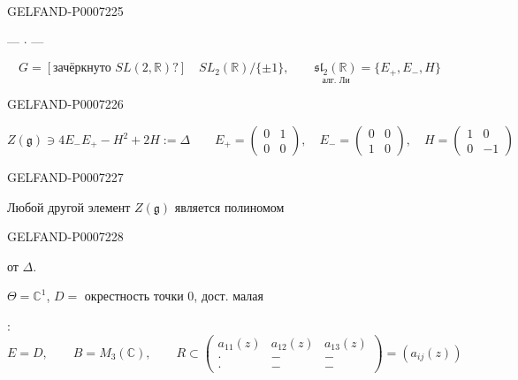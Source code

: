 \begin{GelfandAdjacentEvidence}{GELFAND-P000722}{5}


\begin{center}--- \(\cdot\) ---\end{center}

\[
G=[\text{зачёркнуто }SL(2,\mathbb R)?]\quad SL_2(\mathbb R)/\{\pm1\},
\qquad
\underset{\text{алг. Ли}}{\mathfrak{sl}_2(\mathbb R)}=\{E_+,E_-,H\}
\]
\end{GelfandAdjacentEvidence}
\begin{GelfandAdjacentEvidence}{GELFAND-P000722}{6}

\[
Z(\mathfrak g)\ni 4E_-E_+-H^2+2H:=\Delta
\qquad
E_+=\begin{pmatrix}0&1\\0&0\end{pmatrix},\quad
E_-=\begin{pmatrix}0&0\\1&0\end{pmatrix},
\quad H=\begin{pmatrix}1&0\\0&-1\end{pmatrix}
\]
\end{GelfandAdjacentEvidence}
\begin{GelfandAdjacentEvidence}{GELFAND-P000722}{7}


Любой другой элемент \(Z(\mathfrak g)\) является полиномом
\end{GelfandAdjacentEvidence}
\begin{GelfandAdjacentEvidence}{GELFAND-P000722}{8}

от \(\Delta\).

\(\Theta=\mathbb C^1\), \(D={}\) окрестность точки \(0\), дост. малая
\end{GelfandAdjacentEvidence}


:
\[
E=D,\qquad B=M_3(\mathbb C),\qquad
R\subset
\begin{pmatrix}
a_{11}(z)&a_{12}(z)&a_{13}(z)\\
\cdot&-&-\\
\cdot&-&-
\end{pmatrix}
=(a_{ij}(z))
\]



